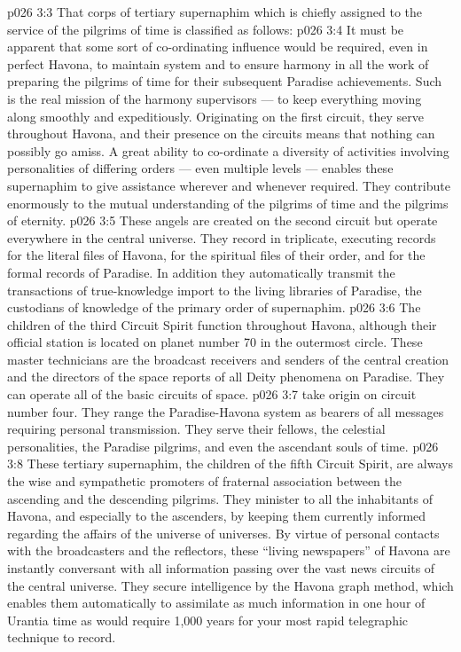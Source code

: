 \vs p026 3:3 \pc That corps of tertiary supernaphim which is chiefly assigned to the service of the pilgrims of time is classified as follows:
\vs p026 3:4 \bibnobreakspace {} It must be apparent that some sort of co\hyp{}ordinating influence would be required, even in perfect Havona, to maintain system and to ensure harmony in all the work of preparing the pilgrims of time for their subsequent Paradise achievements. Such is the real mission of the harmony supervisors --- to keep everything moving along smoothly and expeditiously. Originating on the first circuit, they serve throughout Havona, and their presence on the circuits means that nothing can possibly go amiss. A great ability to co\hyp{}ordinate a diversity of activities involving personalities of differing orders --- even multiple levels --- enables these supernaphim to give assistance wherever and whenever required. They contribute enormously to the mutual understanding of the pilgrims of time and the pilgrims of eternity.
\vs p026 3:5 \bibnobreakspace {} These angels are created on the second circuit but operate everywhere in the central universe. They record in triplicate, executing records for the literal files of Havona, for the spiritual files of their order, and for the formal records of Paradise. In addition they automatically transmit the transactions of true\hyp{}knowledge import to the living libraries of Paradise, the custodians of knowledge of the primary order of supernaphim.
\vs p026 3:6 \bibnobreakspace {} The children of the third Circuit Spirit function throughout Havona, although their official station is located on planet number 70 in the outermost circle. These master technicians are the broadcast receivers and senders of the central creation and the directors of the space reports of all Deity phenomena on Paradise. They can operate all of the basic circuits of space.
\vs p026 3:7 \bibnobreakspace {} take origin on circuit number four. They range the Paradise\hyp{}Havona system as bearers of all messages requiring personal transmission. They serve their fellows, the celestial personalities, the Paradise pilgrims, and even the ascendant souls of time.
\vs p026 3:8 \bibnobreakspace {} These tertiary supernaphim, the children of the fifth Circuit Spirit, are always the wise and sympathetic promoters of fraternal association between the ascending and the descending pilgrims. They minister to all the inhabitants of Havona, and especially to the ascenders, by keeping them currently informed regarding the affairs of the universe of universes. By virtue of personal contacts with the broadcasters and the reflectors, these “living newspapers” of Havona are instantly conversant with all information passing over the vast news circuits of the central universe. They secure intelligence by the Havona graph method, which enables them automatically to assimilate as much information in one hour of Urantia time as would require 1,000 years for your most rapid telegraphic technique to record.
